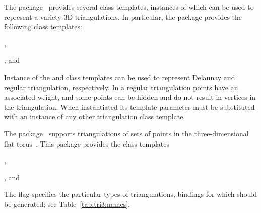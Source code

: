 The \iiiDTriangulationsPackage{} package~\cite{cgal:pt-t3-21a} provides several class templates, instances of which can be used to represent a variety 3D triangulations. In particular, the package provides the following class templates:
\begin{compactenum}
\item {},
\item {}, and
\item {}
\item {}
\end{compactenum}
Instance of the  and  class templates can be used to represent Delaunay and regular triangulation, respectively. In a regular triangulation points have an associated weight, and some points can be hidden and do not result in vertices in the triangulation. When instantiated its template parameter must be substituted with an instance of any other triangulation class template.

The \iiiDPeriodicTriangulationsPackage{} package~\cite{cgal:ct-pt3-21a} supports triangulations of sets of points in the three-dimensional flat torus~\cite{ct-cpt-09}. This package provides the class templates
\begin{compactenum}
\item {},
\item {}, and
\item {}
\item {}
\end{compactenum}

The \cmake{} flag  specifies the particular types of triangulations, bindings for which should be generated; see Table~\ref{tab:tri3:names}.

